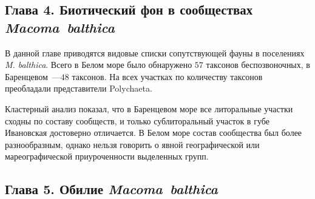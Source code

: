 {{\subsection*{Глава 4. Биотический фон в сообществах \textit{Macoma~balthica}}

В данной главе приводятся видовые списки сопутствующей фауны в поселениях {\it M. balthica}.
Всего в Белом море было обнаружено $57$ таксонов беспозвоночных, в Баренцевом~---$48$ таксонов.
На всех участках по количеству таксонов преобладали представители Polychaeta.

Кластерный анализ показал, что в Баренцевом море все литоральные участки сходны по составу сообществ, и только сублиторальный участок в губе Ивановская достоверно отличается.
В Белом море состав сообщества был более разнообразным, однако нельзя говорить о явной географической или мареографической приуроченности выделенных групп.



\subsection*{Глава 5. Обилие \textit{Macoma~balthica}}

}}
